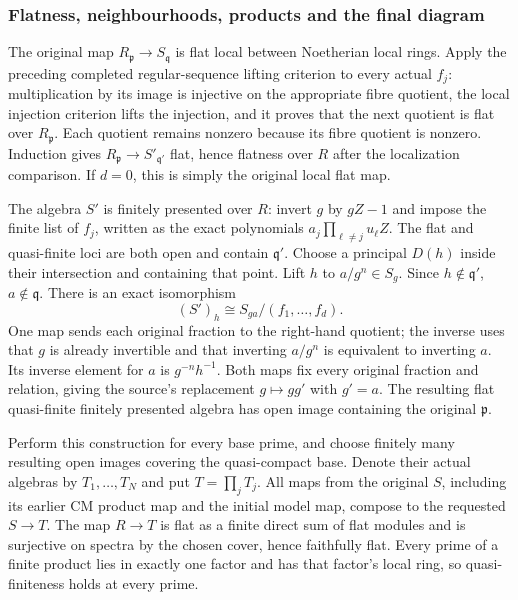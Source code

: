 \subsubsection{Flatness, neighbourhoods, products and the final diagram}\label{flatness-neighbourhoods-products-and-the-final-diagram}

The original map \(R_{\mathfrak p}\to S_{\mathfrak q}\) is flat local between Noetherian local rings. Apply the preceding completed regular-sequence lifting criterion to every actual \(f_j\): multiplication by its image is injective on the appropriate fibre quotient, the local injection criterion lifts the injection, and it proves that the next quotient is flat over \(R_{\mathfrak p}\). Each quotient remains nonzero because its fibre quotient is nonzero. Induction gives \(R_{\mathfrak p}\to S'_{\mathfrak q'}\) flat, hence flatness over \(R\) after the localization comparison. If \(d=0\), this is simply the original local flat map.

The algebra \(S'\) is finitely presented over \(R\): invert \(g\) by \(gZ-1\) and impose the finite list of \(f_j\), written as the exact polynomials \(a_j\prod_{\ell\ne j}u_\ell Z\). The flat and quasi-finite loci are both open and contain \(\mathfrak q'\). Choose a principal \(D(h)\) inside their intersection and containing that point. Lift \(h\) to \(a/g^n\in S_g\). Since \(h\notin\mathfrak q'\), \(a\notin\mathfrak q\). There is an exact isomorphism \[
(S')_h\cong S_{ga}/(f_1,\ldots,f_d).
\] One map sends each original fraction to the right-hand quotient; the inverse uses that \(g\) is already invertible and that inverting \(a/g^n\) is equivalent to inverting \(a\). Its inverse element for \(a\) is \(g^{-n}h^{-1}\). Both maps fix every original fraction and relation, giving the source's replacement \(g\mapsto gg'\) with \(g'=a\). The resulting flat quasi-finite finitely presented algebra has open image containing the original \(\mathfrak p\).

Perform this construction for every base prime, and choose finitely many resulting open images covering the quasi-compact base. Denote their actual algebras by \(T_1,\ldots,T_N\) and put \(T=\prod_jT_j\). All maps from the original \(S\), including its earlier CM product map and the initial model map, compose to the requested \(S\to T\). The map \(R\to T\) is flat as a finite direct sum of flat modules and is surjective on spectra by the chosen cover, hence faithfully flat. Every prime of a finite product lies in exactly one factor and has that factor's local ring, so quasi-finiteness holds at every prime.

